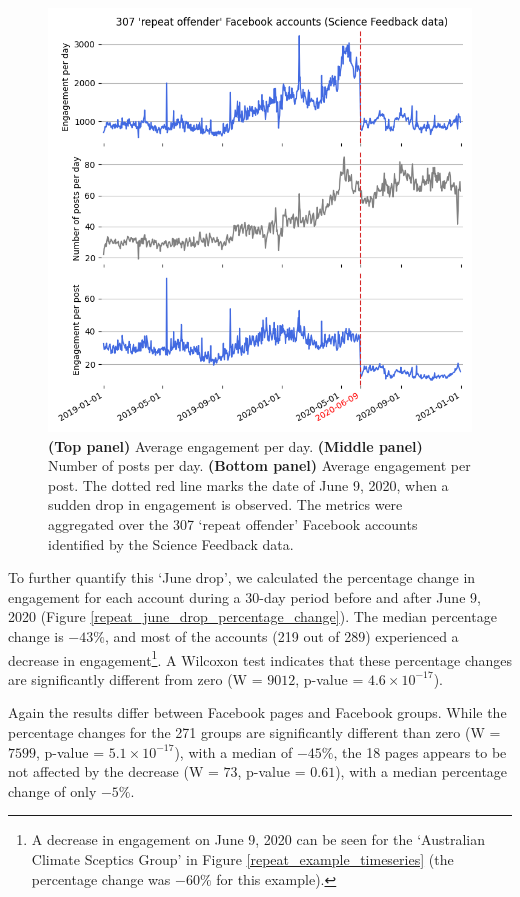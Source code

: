 \documentclass[review]{elsarticle}
\begin{document}
\begin{figure}[!h]
\centering
\includegraphics[scale=0.5]{./../figure/sf_average_timeseries.png}
\caption{
{\bf(Top panel)} Average engagement per day. 
{\bf(Middle panel)} Number of posts per day. 
{\bf(Bottom panel)} Average engagement per post. 
The dotted red line marks the date of June 9, 2020, when a sudden drop in engagement is observed.
The metrics were aggregated over the 307 `repeat offender' Facebook accounts identified by the Science Feedback data.
}
\label{repeat_average_timeseries}
\end{figure}

To further quantify this ‘June drop’, we calculated the percentage change in engagement for each account during a 30-day period before and after June 9, 2020 (Figure \ref{repeat_june_drop_percentage_change}). 
The median percentage change is $-43\%$, and most of the accounts (219 out of 289) experienced a decrease in engagement\footnote{A decrease in engagement on June 9, 2020 can be seen for the `Australian Climate Sceptics Group' in Figure \ref{repeat_example_timeseries} (the percentage change was $-60\%$ for this example).}.
A Wilcoxon test indicates that these percentage changes are significantly different from zero (W = $9012$, p-value = $4.6 \times 10^{-17}$).

Again the results differ between Facebook pages and Facebook groups.
While the percentage changes for the 271 groups are significantly different than zero (W = $7599$, p-value = $5.1 \times 10^{-17}$), with a median of $-45\%$,
the 18 pages appears to be not affected by the decrease (W = $73$, p-value = $0.61$), with a median percentage change of only $-5\%$.
\end{document}
